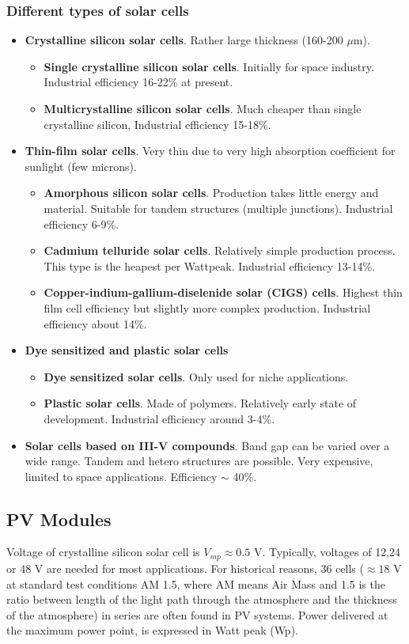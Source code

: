 \documentclass[a4paper,10pt]{article}
\begin{document}
\subsubsection{Different types of solar cells}
\begin{itemize}
 \item \textbf{Crystalline silicon solar cells}. Rather large thickness (160-200 $\mu$m).
 \begin{itemize}
  \item \textbf{Single crystalline silicon solar cells}. Initially for space industry. Industrial efficiency 16-22\% at present.
  \item \textbf{Multicrystalline silicon solar cells}. Much cheaper than single crystalline silicon, Industrial efficiency 15-18\%.
 \end{itemize}
 \item \textbf{Thin-film solar cells}. Very thin due to very high absorption coefficient for sunlight (few microns).
 \begin{itemize}
  \item \textbf{Amorphous silicon solar cells}. Production takes little energy and material. Suitable for tandem structures (multiple junctions). Industrial efficiency 6-9\%.
  \item \textbf{Cadmium telluride solar cells}. Relatively simple production process. This type is the heapest per Wattpeak. Industrial efficiency 13-14\%.
  \item \textbf{Copper-indium-gallium-diselenide solar (CIGS) cells}. Highest thin film cell efficiency but slightly more complex production. Industrial efficiency about 14\%.
 \end{itemize}
 \item \textbf{Dye sensitized and plastic solar cells}
 \begin{itemize}
  \item \textbf{Dye sensitized solar cells}. Only used for niche applications.
  \item \textbf{Plastic solar cells}. Made of polymers. Relatively early state of development. Industrial efficiency around 3-4\%.
 \end{itemize}
 \item \textbf{Solar cells based on III-V compounds}. Band gap can be varied over a wide range. Tandem and hetero structures are possible. Very expensive, limited to space applications. Efficiency $\sim$ 40\%.
\end{itemize}

\subsection{PV Modules}
Voltage of crystalline silicon solar cell is $V_{mp} \approx 0.5$ V. Typically, voltages of 12,24 or 48 V are needed for most applications. For historical reasons, 36 cells ($\approx 18$ V at standard test conditions AM 1.5, where AM means Air Mass and 1.5 is the ratio between length of the light path through the atmosphere and the thickness of the atmosphere) in series are often found in PV systems. Power delivered at the maximum power point, is expressed in Watt peak (Wp). \bigskip
\end{document}
